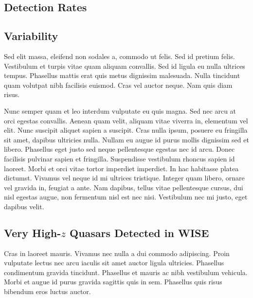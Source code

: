 \documentclass[usenatbib]{mnras}
\begin{document}
\subsection{Detection Rates}

\subsection{Variability}
Sed elit massa, eleifend non sodales a, commodo ut felis. Sed id pretium felis. Vestibulum et turpis vitae quam aliquam convallis. Sed id ligula eu nulla ultrices tempus. Phasellus mattis erat quis metus dignissim malesuada. Nulla tincidunt quam volutpat nibh facilisis euismod. Cras vel auctor neque. Nam quis diam risus.

Nunc semper quam et leo interdum vulputate eu quis magna. Sed nec arcu at orci egestas convallis. Aenean quam velit, aliquam vitae viverra in, elementum vel elit. Nunc suscipit aliquet sapien a suscipit. Cras nulla ipsum, posuere eu fringilla sit amet, dapibus ultricies nulla. Nullam eu augue id purus mollis dignissim sed et libero. Phasellus eget justo sed neque pellentesque egestas nec id arcu. Donec facilisis pulvinar sapien et fringilla. Suspendisse vestibulum rhoncus sapien id laoreet. Morbi et orci vitae tortor imperdiet imperdiet. In hac habitasse platea dictumst. Vivamus vel neque id mi ultrices tristique. Integer quam libero, ornare vel gravida in, feugiat a ante. Nam dapibus, tellus vitae pellentesque cursus, dui nisl egestas augue, non fermentum nisl est nec nisi. Vestibulum nec mi justo, eget dapibus velit.

\subsection{Very High-$z$ Quasars Detected in WISE}
\citet{Blain2013} 
Cras in laoreet mauris. Vivamus nec nulla a dui commodo adipiscing. Proin vulputate lectus nec arcu iaculis sit amet auctor ligula ultricies. Phasellus condimentum gravida tincidunt. Phasellus et mauris ac nibh vestibulum vehicula. Morbi et augue id purus gravida sagittis quis in sem. Phasellus quis risus bibendum eros luctus auctor.
\end{document}
